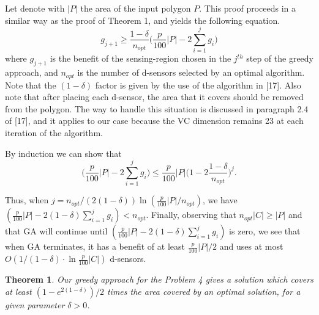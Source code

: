 \documentclass[conference]{IEEEtran}
\newtheorem{theorem}{Theorem}
\newenvironment{proof_}{{\indent \indent \it Proof:}}{\hfill $\blacksquare$\par}
\theoremstyle{definition}
\newtheorem*{NP-Hardness of Approximating the SODkC Problem}{NP-Hardness of Approximating the SODkC Problem}
\newtheorem*{Greedy Algorithm (GA)}{Greedy Algorithm (GA)}
\newtheorem*{GA on the Running Example}{GA on the Running Example}
\newtheorem*{Performance Guarantee of GA}{Performance Guarantee of GA}
\begin{document}
\begin{proof_}
Let denote with $|P|$ the area of the input polygon $P$. This proof proceeds in a similar way as the proof of Theorem 1, and yields the following equation.
\begin{equation*}
    g_{j+1} \geq \frac{1-\delta}{n_{opt}}\Bigg(\frac{p}{100}|P|-2\sum_{i=1}^j g_i \Bigg)
\end{equation*}
where $g_{j+1}$ is the benefit of the sensing-region chosen in the $j^{th}$ step of the greedy approach, and $n_{opt}$ is the number of d-sensors selected by an optimal algorithm.
Note that the $(1 - \delta)$ factor is given by the use of the algorithm in [17]. Also note that after placing each d-sensor, the area that it covers should be removed from the polygon. The way to handle this situation is discussed in paragraph 2.4 of [17], and it applies to our case because the VC dimension remains 23 at each iteration of the algorithm.

By induction we can show that
\begin{equation*}
\Bigg(\frac{p}{100}|P|-2\sum_{i=1}^j g_i \Bigg) \leq \frac{p}{100} |P| \bigg(1-2\frac{1-\delta}{n_{opt}}\bigg)^j.    
\end{equation*}

Thus, when $j = n_{opt}/(2(1 - \delta)) \ln( \frac{p}{100}|P|/n_{opt})$, we have $(\frac{p}{100}|P|-2(1-\delta) \sum_{i=1}^j g_i) < n_{opt}$. Finally, observing that $n_{opt}|C|\geq|P|$ and that GA will continue until $( \frac{p}{100}|P| -2(1-\delta) \sum_{i=1}^j g_i)$ is zero, we see that when GA terminates, it has a benefit of at least $\frac{p}{100}|P|/2$ and uses at most $O(1/(1 - \delta) \cdot \ln \frac{p}{100}|C|)$ d-sensors.
\end{proof_}

\begin{theorem}
Our greedy approach for the Problem 4 gives a solution which covers at least $(1 - e^{2(1-\delta)})/2$ times the area covered by an optimal solution, for a given parameter $\delta > 0$.
\end{theorem}
\end{document}
